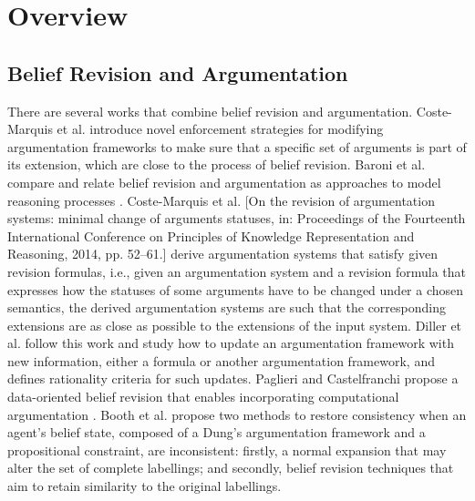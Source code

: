 \section{Overview}



\subsection{Belief Revision and Argumentation}

There are several works that combine belief revision and argumentation. 
% 
Coste-Marquis et al. \cite{Cos.Kon.Mai.Mar2015} introduce novel enforcement strategies for modifying argumentation frameworks to make sure that a specific set of arguments is part of its extension, which are close to the process of belief revision. 
% 
Baroni et al. compare and relate belief revision and argumentation as approaches to model reasoning processes \cite{Bar.Fer.Gia.Sim2022}. 
% 
Coste-Marquis et al. [On the revision of argumentation systems: minimal change of arguments statuses, in: Proceedings of the
Fourteenth International Conference on Principles of Knowledge Representation and Reasoning, 2014, pp. 52–61.] derive argumentation systems that satisfy given revision formulas, i.e., given an argumentation system and a revision formula that expresses how the statuses of some arguments have to be changed under a chosen semantics, the derived argumentation systems are such that the corresponding extensions are as close as possible to the extensions of the input system.
% 
% 
Diller et al. \cite{Dil.Har.Lin.Rum.Wol2018} follow this work and study how to update an argumentation framework with new information, 
either a formula or another argumentation framework, 
and defines rationality criteria for such updates. 
% 
% 
Paglieri and Castelfranchi propose a data-oriented belief revision that enables incorporating computational argumentation \cite{Pag.Cas2005}. 
% 
% 
Booth et al. \cite{Boo.Kac.Rie.van2013} propose two methods to restore consistency when an agent's belief state, 
composed of a Dung's argumentation framework and a propositional constraint, 
are inconsistent: 
firstly, a normal expansion that may alter the set of complete labellings; 
and secondly, belief revision techniques that aim to retain similarity to the original labellings.






